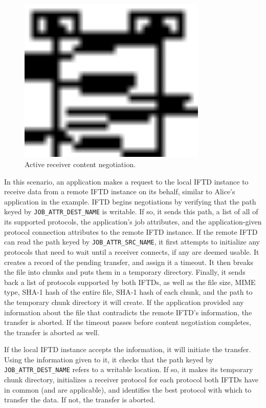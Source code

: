 \begin{figure}[h!]
    \centering
    \includegraphics[width=0.8\textwidth]{diagrams/iftd-active-receiver-setup}
    \caption{Active receiver content negotiation.}
    \label{iftd-active-receiver-setup}
\end{figure}

In this scenario, an application makes a request to the local IFTD instance to receive data from a remote IFTD instance on its behalf, similar to Alice's application in the example.  IFTD begins negotiations by verifying that the path keyed by \texttt{JOB\_ATTR\_DEST\_NAME} is writable.  If so, it sends this path, a list of all of its supported protocols, the application's job attributes, and the application-given protocol connection attributes to the remote IFTD instance.  If the remote IFTD can read the path keyed by \texttt{JOB\_ATTR\_SRC\_NAME}, it first attempts to initialize any protocols that need to wait until a receiver connects, if any are deemed usable.  It creates a record of the pending transfer, and assign it a timeout.  It then breaks the file into chunks and puts them in a temporary directory.  Finally, it sends back a list of protocols supported by both IFTDs, as well as the file size, MIME type, SHA-1 hash of the entire file, SHA-1 hash of each chunk, and the path to the temporary chunk directory it will create.  If the application provided any information about the file that contradicts the remote IFTD's information, the transfer is aborted.  If the timeout passes before content negotiation completes, the transfer is aborted as well.

If the local IFTD instance accepts the information, it will initiate the transfer.  Using the information given to it, it checks that the path keyed by \texttt{JOB\_ATTR\_DEST\_NAME} refers to a writable location.  If so, it makes its temporary chunk directory, initializes a receiver protocol for each protocol both IFTDs have in common (and are applicable), and identifies the best protocol with which to transfer the data.  If not, the transfer is aborted.  

